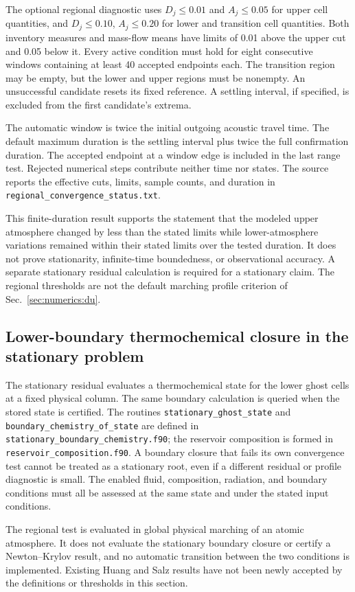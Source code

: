 The optional regional diagnostic uses $D_j\leq0.01$ and $A_j\leq0.05$ for upper cell
quantities, and $D_j\leq0.10$, $A_j\leq0.20$ for lower and transition cell
quantities. Both inventory measures and mass-flow means have limits of 0.01
above the upper cut and 0.05 below it. Every active condition must hold for
eight consecutive windows containing at least 40 accepted endpoints each.
The transition region may be empty, but the lower and upper regions must be
nonempty. An unsuccessful candidate resets its fixed reference. A settling
interval, if specified, is excluded from the first candidate's extrema.

The automatic window is twice the initial outgoing acoustic travel time.
The default maximum duration is the settling interval plus twice the full
confirmation duration. The accepted endpoint at a window edge is included in
the last range test. Rejected numerical steps contribute neither time nor
states. The source reports the effective cuts, limits, sample counts, and
duration in \texttt{regional\_convergence\_status.txt}.

This finite-duration result supports the statement that the modeled upper
atmosphere changed by less than the stated limits while lower-atmosphere
variations remained within their stated limits over the tested duration. It
does not prove stationarity, infinite-time boundedness, or observational
accuracy. A separate stationary residual calculation is required for a
stationary claim. The regional thresholds are not the default marching
profile criterion of Sec.~\ref{sec:numerics:du}.

\subsection{Lower-boundary thermochemical closure in the stationary problem}

The stationary residual evaluates a thermochemical state for the
lower ghost cells at a fixed physical column. The same boundary calculation
is queried when the stored state is certified. The routines
\texttt{stationary\_ghost\_state} and
\texttt{boundary\_chemistry\_of\_state} are defined in
\texttt{stationary\_boundary\_chemistry.f90}; the reservoir composition is
formed in \texttt{reservoir\_composition.f90}. A boundary closure that fails
its own convergence test cannot be treated as a stationary root, even if a
different residual or profile diagnostic is small. The enabled fluid,
composition, radiation, and boundary conditions must all be assessed at the
same state and under the stated input conditions.

The regional test is evaluated in global physical marching of an atomic
atmosphere. It does not evaluate the stationary boundary closure or certify a
Newton--Krylov result, and no automatic transition between the two conditions
is implemented. Existing Huang and Salz results have not been newly accepted
by the definitions or thresholds in this section.
